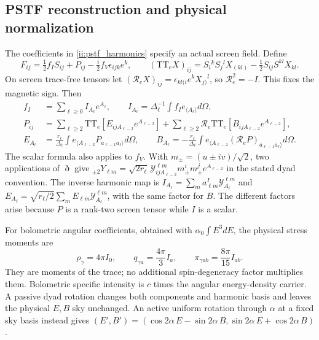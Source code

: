 \subsection{PSTF reconstruction and physical normalization}
The coefficients in \eqref{ii:pstf_harmonics} specify an actual screen field. Define
\begin{equation}
 F_{ij}=\tfrac12f_IS_{ij}+P_{ij}-\tfrac i2f_V\epsilon_{ijk}e^k,\qquad
 (\mathrm{TT}_e X)_{ij}=S_i{}^kS_j{}^lX_{(kl)}-\tfrac12S_{ij}S^{kl}X_{kl}.
 \label{ii:pstf_screen_decomposition}
\end{equation}
On screen trace-free tensors let $(\mathcal R_eX)_{ij}=\epsilon_{kl(i}e^kX_{j)}{}^l$, so $\mathcal R_e^2=-I$. This fixes the magnetic sign. Then
\begin{align}
 f_I&=\sum_{\ell\ge0}I_{A_\ell}e^{A_\ell},\qquad
 I_{A_\ell}=\Delta_\ell^{-1}\int f_Ie_{\langle A_\ell\rangle}d\Omega,\nonumber\\
 P_{ij}&=\sum_{\ell\ge2}\mathrm{TT}_e[E_{ijA_{\ell-2}}e^{A_{\ell-2}}]
       +\sum_{\ell\ge2}\mathcal R_e\mathrm{TT}_e[B_{ijA_{\ell-2}}e^{A_{\ell-2}}],\nonumber\\
 E_{A_\ell}&=\frac{r_\ell}{\Delta_\ell}\int e_{\langle A_{\ell-2}}P_{a_{\ell-1}a_\ell\rangle}d\Omega,\qquad
 B_{A_\ell}=-\frac{r_\ell}{\Delta_\ell}\int e_{\langle A_{\ell-2}}(\mathcal R_eP)_{a_{\ell-1}a_\ell\rangle}d\Omega.
 \label{ii:pstf_reconstruction}
\end{align}
The scalar formula also applies to $f_V$. With $m_\pm=(u\pm iv)/\sqrt2$, two applications of $\eth$ give
${}_{\pm2}Y_{\ell m}=\sqrt{2r_\ell}\,\mathcal Y^{\ell m}_{ijA_{\ell-2}}m_\pm^im_\pm^je^{A_{\ell-2}}$ in the stated dyad convention. The inverse harmonic map is
$I_{A_\ell}=\sum_m a^I_{\ell m}\mathcal Y^{\ell m}_{A_\ell}$ and
$E_{A_\ell}=\sqrt{r_\ell/2}\sum_m E_{\ell m}\mathcal Y^{\ell m}_{A_\ell}$, with the same factor for $B$. The different factors arise because $P$ is a rank-two screen tensor while $I$ is a scalar.

For bolometric angular coefficients, obtained with $\alpha_0\int E^3dE$, the physical stress moments are
\begin{equation}
 \rho_\gamma=4\pi I_0,\qquad q_{\gamma a}=\frac{4\pi}{3}I_a,\qquad
 \pi_{\gamma ab}=\frac{8\pi}{15}I_{ab}.
 \label{ii:bolometric_PSTF_moments}
\end{equation}
They are moments of the trace; no additional spin-degeneracy factor multiplies them. Bolometric specific intensity is $c$ times the angular energy-density carrier. A passive dyad rotation changes both components and harmonic basis and leaves the physical $E,B$ sky unchanged. An active uniform rotation through $\alpha$ at a fixed sky basis instead gives
$(E',B')=(\cos2\alpha\,E-\sin2\alpha\,B,\sin2\alpha\,E+\cos2\alpha\,B)$.

